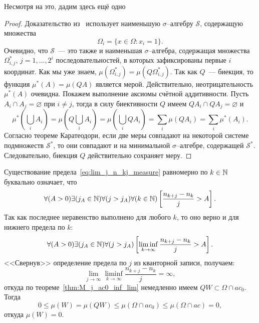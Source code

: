 Несмотря на это, дадим здесь ещё одно
\begin{proof}
	Доказательство из~\cite{connor1990almost} использует наименьшую $\sigma$--алгебру $\mathcal{S}$,
	содержащую множества
	\begin{equation}
		\Omega_i = \{x\in\Omega: x_i = 1\}
		.
	\end{equation}
	Очевидно, что $\mathcal{S}$~--- это также и наименьшая $\sigma$--алгебра, содержащая множества
	$\Omega^*_{i,j}$, $j=1,...,2^i$ последовательностей, в которых зафиксированы первые $i$ координат.
	Как мы уже знаем, $\mu(\Omega^*_{i,j}) = \mu(Q\Omega^*_{i,j})$.
	Так как $Q$~--- биекция, то функция $\mu^*(A) = \mu(QA)$ является мерой.
	Действительно, неотрицательность $\mu^*(A)$ очевидна.
	Покажем выполнение аксиомы счётной аддитивности.
	Пусть $A_i \cap A_j = \varnothing$ при $i\neq j$,
	тогда в силу биективности $Q$ имеем $QA_i \cap QA_j = \varnothing$ и
	\begin{equation}
		\mu^*\left( \bigcup_i A_i \right)
		=
		\mu\left( Q \bigcup_i A_i \right)
		=
		\mu\left( \bigcup_i QA_i \right)
		=
		\sum_i 	\mu( QA_i )
		=
		\sum_i 	\mu^*( A_i )
		.
	\end{equation}
	Согласно теореме Каратеодори,
	если две меры совпадают на некоторой системе подмножеств $\mathcal{S}^*$,
	то они совпадают и на минимальной $\sigma$--алгебре, содержащей $\mathcal{S}^*$.
	Следовательно, биекция $Q$ действительно сохраняет меру.
\end{proof}


Существование предела~\eqref{eq:lim_j_n_kj_measure}
равномерно по $k\in \mathbb{N}$
буквально означает, что
\begin{equation}
	\forall(A>0)\exists(j_A\in\mathbb{N})\forall(j > j_A)\forall(k\in\mathbb{N})
	\left[
		\frac{n_{k+j}-n_k}{j}>A
	\right]
	.
\end{equation}
Так как последнее неравенство выполнено для любого $k$,
то оно верно и для нижнего предела по $k$:
\begin{equation}
	\forall(A>0)\exists(j_A\in\mathbb{N})\forall(j > j_A)
	\left[
		\liminf_{k\to\infty}\frac{n_{k+j}-n_k}{j}>A
	\right]
	.
\end{equation}
<<Свернув>> определение предела по $j$ из кванторной записи, получаем:
\begin{equation}
	\lim_{j\to\infty}\liminf_{k\to\infty}\frac{n_{k+j}-n_k}{j} = \infty
	,
\end{equation}
откуда по теореме~\ref{thm:M_j_ac0_inf_lim} немедленно имеем $QW \subset \Omega\cap ac_0$.
Тогда
\begin{equation}
	0 \leq \mu(W) = \mu(QW) \leq \mu(\Omega\cap ac_0) \leq \mu(\Omega\cap ac) = 0
	,
\end{equation}
откуда $\mu(W)=0$.


